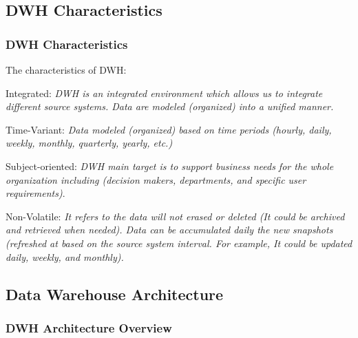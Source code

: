 \subsection{DWH Characteristics}
\begin{frame}
\frametitle{DWH Characteristics}
\begin{wideitemize}
\item The characteristics of DWH:
	\begin{wideitemize}
		\item Integrated: \textit{DWH is an integrated environment which allows us to integrate different source systems. Data are modeled (organized) into a unified manner.} %
	
		\item Time-Variant: \textit{Data modeled (organized) based on time periods (hourly, daily, weekly, monthly, quarterly, yearly, etc.)}
	
		\item Subject-oriented: \textit{DWH main target is to support business needs for the whole organization including (decision makers, departments, and specific user requirements)}.
	
		\item Non-Volatile: \textit{It refers to the data will not erased or deleted (It could be archived and retrieved when needed). Data can be accumulated daily the new snapshots (refreshed at based on the source system interval. For example, It could be updated daily, weekly, and monthly).}
	\end{wideitemize}	
\end{wideitemize}

\end{frame}
\subsection{Data Warehouse Architecture}
\begin{frame}
\frametitle{DWH Architecture Overview}


\end{frame}


